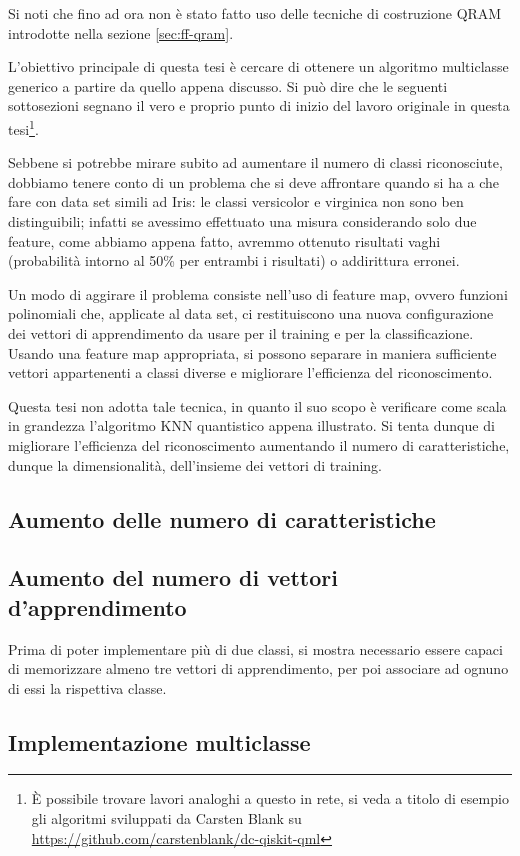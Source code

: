 Si noti che fino ad ora non è stato fatto uso delle tecniche di costruzione \ac{QRAM} 
introdotte nella sezione \ref{sec:ff-qram}. 

L'obiettivo principale di questa tesi è cercare di ottenere un algoritmo multiclasse generico 
a partire da quello appena discusso. Si può dire che le seguenti sottosezioni segnano il vero e proprio 
punto di inizio del lavoro originale in questa tesi\footnote{È possibile trovare lavori analoghi 
a questo in rete, si veda a titolo di esempio gli algoritmi sviluppati da Carsten Blank su 
\url{https://github.com/carstenblank/dc-qiskit-qml}}. 

Sebbene si potrebbe mirare subito ad aumentare il numero di classi riconosciute, dobbiamo tenere 
conto di un problema che si deve affrontare quando si ha a che fare con data set simili ad Iris: 
le classi versicolor e virginica non sono ben distinguibili; infatti se avessimo effettuato una 
misura considerando solo due feature, come abbiamo appena fatto, avremmo ottenuto risultati vaghi 
(probabilità intorno al 50\% per entrambi i risultati) o addirittura erronei. 

Un modo di aggirare il problema consiste nell'uso di feature map\cite{schuld}, ovvero funzioni polinomiali che, 
applicate al data set, ci restituiscono una nuova configurazione dei vettori di apprendimento da 
usare per il training e per la classificazione. Usando una feature map appropriata, si possono 
separare in maniera sufficiente vettori appartenenti a classi diverse e migliorare l'efficienza 
del riconoscimento. 

Questa tesi non adotta tale tecnica, in quanto il suo scopo è verificare come scala in grandezza 
l'algoritmo \ac{KNN} quantistico appena illustrato. Si tenta dunque di migliorare l'efficienza 
del riconoscimento aumentando il numero di caratteristiche, dunque la dimensionalità, dell'insieme 
dei vettori di training. 

\subsection{Aumento delle numero di caratteristiche}



\subsection{Aumento del numero di vettori d'apprendimento}

Prima di poter implementare più di due classi, si mostra necessario essere capaci di 
memorizzare almeno tre vettori di apprendimento, per poi associare ad ognuno di essi la 
rispettiva classe. 

\subsection{Implementazione multiclasse}




